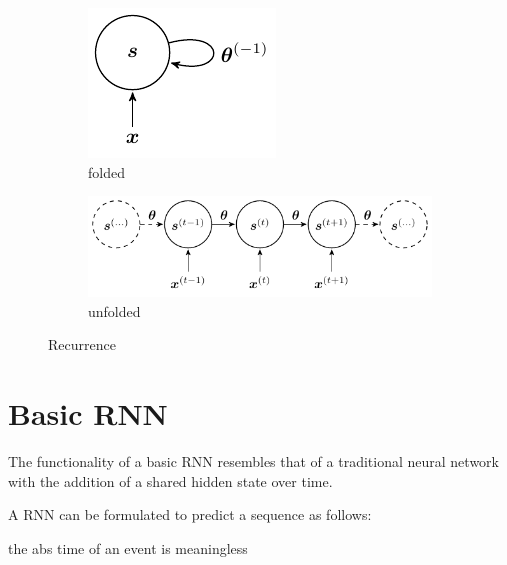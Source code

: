 \begin{figure}[H]
  \centering
  \begin{subfigure}[]{.2\textwidth}
    \begin{center}
    \includegraphics[]{figs/recurrent.pdf}
    \end{center}
    \caption{folded}
    \label{fig:recurrent}
  \end{subfigure}
  \begin{subfigure}[]{.79\textwidth}
    \begin{center}
    \includegraphics[]{figs/recurrent_uf.pdf}
    \end{center}
    \caption{unfolded}
    \label{fig:recurrent_uf}
  \end{subfigure}
  \caption{Recurrence}
  \label{fig:recurrence}
\end{figure}


\section{Basic RNN}

The functionality of a basic RNN resembles that of a traditional neural network with the addition of a shared hidden state over time.

A RNN can be formulated to predict a sequence as follows:



the abs time of an event is meaningless

